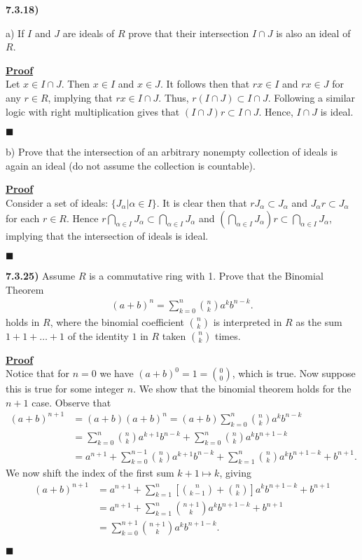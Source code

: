 \documentclass[12pt,a4paper]{article}
\newcommand{\prob}[2]{\textbf{#1)} #2}
\newenvironment{proof}
{
\textbf{\underline{Proof}} \\
}
{
\begin{flushright}
$\blacksquare$
\end{flushright}}
\begin{document}
\prob{7.3.18}{}

a) If $I$ and $J$ are ideals of $R$ prove that their intersection $I \cap J$ is also an ideal of $R$.

\begin{proof}
	Let $x \in I \cap J$.
	Then $x \in I$ and $x \in J$.
	It follows then that $rx \in I$ and $rx \in J$ for any $r \in R$, implying that $rx \in I \cap J$.
	Thus, $r(I \cap J) \subset I \cap J$.
	Following a similar logic with right multiplication gives that $(I \cap J)r \subset I \cap J$.
	Hence, $I \cap J$ is ideal.
\end{proof}

b) Prove that the intersection of an arbitrary nonempty collection of ideals is again an ideal (do not assume the collection is countable).

\begin{proof}
	Consider a set of ideals: $\{ J_{\alpha} | \alpha \in I \}$.
	It is clear then that $rJ_{\alpha} \subset J_{\alpha}$  and $J_{\alpha}r \subset J_{\alpha}$ for each $r \in R$.
	Hence $r \bigcap_{\alpha \in I} J_{\alpha} \subset \bigcap_{\alpha \in I} J_{\alpha}$ and $\left( \bigcap_{\alpha \in I} J_{\alpha} \right) r \subset \bigcap_{\alpha \in I} J_{\alpha}$, implying that the intersection of ideals is ideal.
\end{proof}

\prob{7.3.25}{
Assume $R$ is a commutative ring with 1. Prove that the Binomial Theorem
\begin{align*}
    \left( a + b \right)^{n} = \sum_{k=0}^{n} {n \choose k} a^{k}b^{n-k}
.\end{align*}
holds in $R$, where the binomial coefficient $n \choose k$ is interpreted in $R$ as the sum $1 + 1 + \ldots + 1$ of the identity $1$ in $R$ taken $n \choose k$ times.
}

\begin{proof}
	Notice that for $n=0$ we have $(a + b)^0 = 1 = {0 \choose 0}$, which is true.
	Now suppose this is true for some integer $n$.
	We show that the binomial theorem holds for the $n + 1$ case.
	Observe that
	\begin{align*}
		(a + b)^{n+1} &= (a+b)(a+b)^n = (a+b)\sum_{k=0}^{n} {n \choose k}a^kb^{n-k} \\
		&= \sum_{k=0}^{n} {n \choose k}a^{k+1}b^{n-k} + \sum_{k=0}^{n} {n \choose k}a^kb^{n+1-k} \\
		&= a^{n+1} + \sum_{k=0}^{n-1} {n \choose k} a^{k+1}b^{n-k} + \sum_{k=1}^{n} {n \choose k}a^kb^{n+1-k} + b^{n+1} 
	.\end{align*}
	We now shift the index of the first sum $k+1 \mapsto k$, giving
	\begin{align*}
		(a + b)^{n+1} &= a^{n+1} + \sum_{k=1}^{n} \left[{n \choose k-1} + {n \choose k} \right] a^{k}b^{n+1-k} + b^{n+1} \\
		&= a^{n+1} + \sum_{k=1}^{n} {n+1 \choose k} a^{k}b^{n+1-k} + b^{n+1} \\
		&= \sum_{k=0}^{n+1} {n+1 \choose k} a^kb^{n+1-k}
	.\end{align*}
\end{proof}
\end{document}
